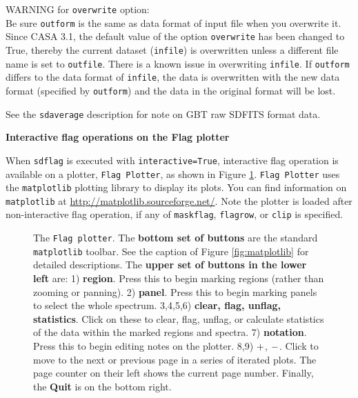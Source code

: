 WARNING for {\tt overwrite} option:\\
Be sure {\tt outform} is the same as data format of input file when you
overwrite it. Since CASA 3.1, the default value of the option {\tt overwrite}
has been changed to True, thereby the current dataset ({\tt infile}) is 
overwritten unless a different file name is set to {\tt outfile}. 
There is a known issue in overwriting {\tt infile}. If {\tt outform} differs to the
data format of {\tt infile}, the data is overwritten with the new data format 
(specified by {\tt outform}) and the data in the original format will be lost.

See the {\tt sdaverage} description for note on GBT raw SDFITS format data.


\bigskip
{\bf Interactive flag operations on the Flag plotter}

When {\tt sdflag} is executed with {\tt interactive=True}, 
interactive flag operation is available on a plotter, {\tt Flag Plotter}, 
as shown in Figure \ref{fig:flagplotter}.
{\tt Flag Plotter} uses the {\tt matplotlib} plotting library to display 
its plots. You can find information on {\tt matplotlib} at
\url{http://matplotlib.sourceforge.net/}.
Note the plotter is loaded after non-interactive flag operation, 
if any of {\tt maskflag}, {\tt flagrow}, or {\tt clip} is specified.

\begin{figure}[h!]
\begin{center}
\caption{\label{fig:flagplotter} 
  The {\tt Flag plotter}.
  The {\bf bottom set of buttons} are the standard {\tt matplotlib} toolbar. 
  See the caption of Figure \ref{fig:matplotlib} for detailed descriptions.
  The {\bf upper set of buttons in the lower left} are:
  1) {\bf region}. Press this to begin marking regions (rather than
  zooming or panning).  
  2) {\bf panel}. Press this to begin marking panels to select the whole 
  spectrum.
  3,4,5,6) {\bf clear, flag, unflag, statistics}.  Click on these to clear, 
  flag, unflag, or calculate statistics of the data within the marked 
  regions and spectra.  
  7) {\bf notation}. Press this to begin editing notes on the plotter. 
  8,9) $ {\bf +} $, $ {\bf -} $. Click to move to the next or previous page in a series 
  of iterated plots. The page counter on their left shows the current page 
  number. Finally, the {\bf Quit} is on the bottom right.}
\hrulefill
\end{center}
\end{figure}


